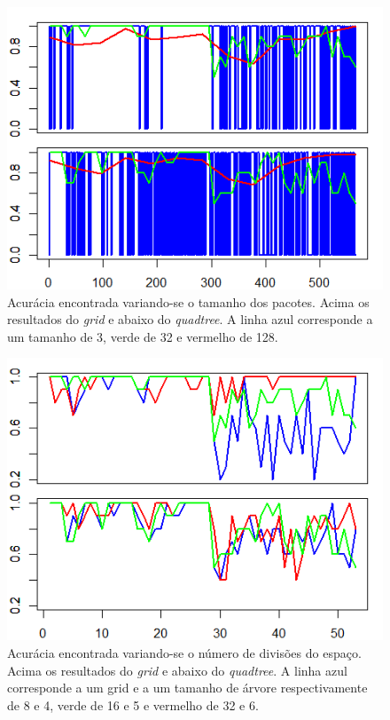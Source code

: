 \documentclass[conference]{IEEEtran}
\begin{document}
\begin{figure}[h]
\centerline{\includegraphics[width=0.9\columnwidth]{fig/acc_batch.png}}
\caption{Acurácia encontrada variando-se o tamanho dos pacotes. Acima os resultados do \textit{grid} e abaixo do \textit{quadtree}. A linha azul corresponde a um tamanho de 3, verde de 32 e vermelho de 128.}
\label{accbatch}
\end{figure}

\begin{figure}[h]
\centerline{\includegraphics[width=0.9\columnwidth]{fig/acc_parts.png}}
\caption{Acurácia encontrada variando-se o número de divisões do espaço. Acima os resultados do \textit{grid} e abaixo do \textit{quadtree}. A linha azul corresponde a um grid e a um tamanho de árvore respectivamente de 8 e 4, verde de 16 e 5 e vermelho de 32 e 6.}
\label{accparts}
\end{figure}
\end{document}

